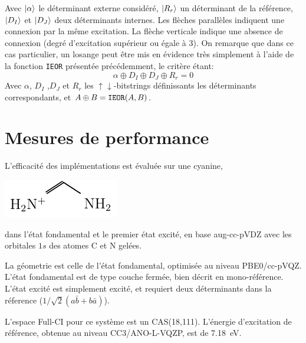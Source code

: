 \documentclass[./thesis.tex]{subfiles}
\begin{document}
Avec ${\ket{\alpha}}$ le déterminant externe considéré, $\ket {R_r}$ un déterminant de la référence, $\ket {D_I}$ et $\ket {D_J}$ deux déterminants internes. Les flèches parallèles indiquent une connexion par la même excitation. La flèche verticale indique une absence de connexion (degré d'excitation supérieur ou égale à 3).
On remarque que dans ce cas particulier, un losange peut être mis en évidence très simplement à l'aide de la fonction \texttt{IEOR} présentée précédemment, le critère étant:
\begin{equation}
\alpha \oplus D_I \oplus D_J \oplus R_r = 0
\end{equation}
Avec $\alpha$, $D_I$ ,$D_J$ et $R_r$ les $\uparrow \downarrow$-bitstrings définissants les déterminants correspondants, et $A \oplus B = \text{\texttt{IEOR}}(A,B)$. 
\clearpage

\section{Mesures de performance}
L'efficacité des implémentations est évaluée sur une cyanine, \\
\begin{center}
\includegraphics[]{figures/perf/Cyanine} \\
\end{center}
dans l'état fondamental et le premier état excité, en base aug-cc-pVDZ avec les orbitales $1s$ des atomes C et N gelées.

La géometrie est celle de l'état fondamental, optimisée au niveau PBE0/cc-pVQZ. L'état fondamental est de type couche fermée, bien décrit en mono-référence. L'état excité est simplement excité, et requiert deux déterminants dans la réference ($1/\sqrt{2} (a\bar{b} + b\bar{a})$).

L'espace Full-CI pour ce système est un CAS(18,111). L'énergie d'excitation de référence, obtenue au niveau CC3/ANO-L-VQZP, est de 7.18~eV.\cite{Send_2011}
\end{document}
